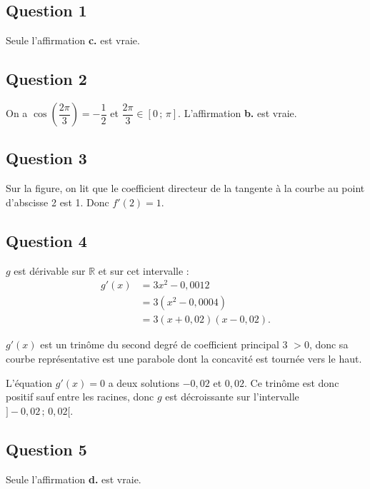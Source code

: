 \subsection*{Question 1}

Seule l'affirmation \textbf{c.} est vraie.

\subsection*{Question 2}

On a \( \cos\left(\dfrac{2\pi}{3}\right) = -\dfrac{1}{2} \) et \( \dfrac{2\pi}{3} \in [0 \,;\, \pi] \). L'affirmation \textbf{b.} est vraie.

\subsection*{Question 3}

Sur la figure, on lit que le coefficient directeur de la tangente à la courbe au point d'abscisse 2 est 1. Donc \( f'(2) = 1 \).

\subsection*{Question 4}

\( g \) est dérivable sur \( \mathbb{R} \) et sur cet intervalle :
\begin{align*}
g'(x) &= 3x^2 - 0{,}0012 \\
&= 3\left(x^2 - 0{,}0004\right) \\
&= 3(x + 0{,}02)(x - 0{,}02).
\end{align*}

\( g'(x) \) est un trinôme du second degré de coefficient principal 3 \(> 0\), donc sa courbe représentative est une parabole dont la concavité est tournée vers le haut.

L'équation \( g'(x) = 0 \) a deux solutions \( -0{,}02 \) et \( 0{,}02 \). Ce trinôme est donc positif sauf entre les racines, donc \( g \) est décroissante sur l'intervalle \( ]-0{,}02 \,;\, 0{,}02[ \).

\subsection*{Question 5}

Seule l'affirmation \textbf{d.} est vraie.
